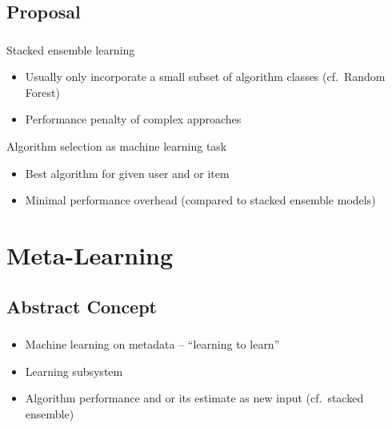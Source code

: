 \documentclass[aspectratio=169]{beamer}
\begin{document}
\subsection{Proposal}
\begin{frame}
	\frametitle{\insertsection}
	\framesubtitle{\insertsubsection}

	\begin{itemize}
		\item Stacked ensemble learning
		\begin{itemize}
			\item Usually only incorporate a small subset of algorithm classes (cf.\ Random Forest)
			\item Performance penalty of complex approaches
		\end{itemize}
		{
			\item Algorithm selection as machine learning task
		}
		\begin{itemize}
			\item Best algorithm for given user and or item
			\item Minimal performance overhead (compared to stacked ensemble models)
		\end{itemize}
	\end{itemize}
\end{frame}

\section[Literature]{Meta-Learning}
\frame{\vfill\centering\tableofcontents[sectionstyle=show/shaded,subsectionstyle=show/hide]\vfill}

\subsection{Abstract Concept}
\begin{frame}
	\frametitle{\insertsection}
	\framesubtitle{\insertsubsection}

	\begin{itemize}
		\item Machine learning on metadata -- ``learning to learn''
		\item Learning subsystem
		\item Algorithm performance and or its estimate as new input (cf.\ stacked ensemble)
	\end{itemize}
\end{frame}
\end{document}
